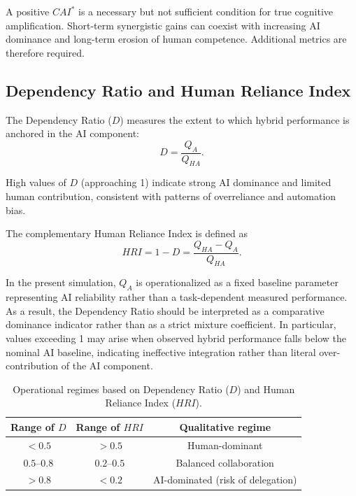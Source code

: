 \documentclass[11pt,a4paper]{article}
\begin{document}
A positive $CAI^*$ is a necessary but not sufficient condition for true cognitive amplification. Short-term synergistic gains can coexist with increasing AI dominance and long-term erosion of human competence. Additional metrics are therefore required.

\subsection{Dependency Ratio and Human Reliance Index}

The Dependency Ratio ($D$) measures the extent to which hybrid performance is anchored in the AI component:
\begin{equation}
D = \frac{Q_A}{Q_{HA}}.
\end{equation}

High values of $D$ (approaching 1) indicate strong AI dominance and limited human contribution, consistent with patterns of overreliance and automation bias.

The complementary Human Reliance Index is defined as
\begin{equation}
HRI = 1 - D = \frac{Q_{HA} - Q_A}{Q_{HA}}.
\end{equation}

In the present simulation, $Q_A$ is operationalized as a fixed baseline parameter representing AI reliability rather than a task-dependent measured performance. As a result, the Dependency Ratio should be interpreted as a comparative dominance indicator rather than as a strict mixture coefficient. In particular, values exceeding 1 may arise when observed hybrid performance falls below the nominal AI baseline, indicating ineffective integration rather than literal over-contribution of the AI component.

\begin{table}[htbp]
\centering
\begin{tabular}{ccc}
\toprule
Range of $D$ & Range of $HRI$ & Qualitative regime \\
\midrule
$< 0.5$  & $> 0.5$ & Human-dominant \\
$0.5$--$0.8$ & $0.2$--$0.5$ & Balanced collaboration \\
$> 0.8$  & $< 0.2$ & AI-dominated (risk of delegation) \\
\bottomrule
\end{tabular}
\caption{Operational regimes based on Dependency Ratio ($D$) and Human Reliance Index ($HRI$).}
\label{tab:dependency}
\end{table}
\end{document}
